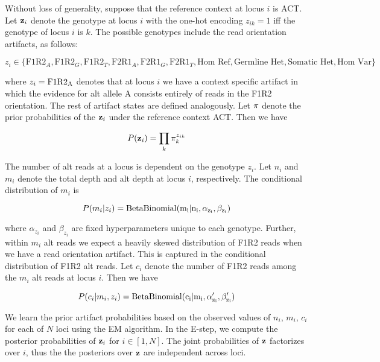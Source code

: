 \documentclass[nofootinbib,amssymb,amsmath]{revtex4}
\newcommand{\vz}{{\bf z}}
\newcommand{\vpi}{{\bf \pi}}
\begin{document}
Without loss of generality, suppose that the reference context at locus $i$ is ACT. Let $\vz_i$ denote the genotype at locus $i$ with the one-hot encoding $z_{ik} = 1$ iff the genotype of locus $i$ is $k$. The possible genotypes include the read orientation artifacts, as follows:

\begin{equation*}
z_i \in \{ \text{F1R2}_A, \text{F1R2}_G, \text{F1R2}_T, \text{F2R1}_A, \text{F2R1}_G, \text{F2R1}_T,  \text{Hom Ref}, \text{Germline Het}, \text{Somatic Het}, \text{Hom Var} \}
\end{equation*}

where $z_i = \rm{F1R2_A}$ denotes that at locus $i$ we have a context specific artifact in which the evidence for alt allele A consists entirely of reads in the F1R2 orientation. The rest of artifact states are defined analogously. Let $\vpi$ denote the prior probabilities of the $\vz_i$ under the reference context ACT. Then we have 

\begin{equation}
P(\vz_i) = \prod_k \pi_{k}^{z_{ik}}
\end{equation}

The number of alt reads at a locus is dependent on the genotype $z_i$. Let $n_i$ and $m_i$ denote the total depth and alt depth at locus $i$, respectively. The conditional distribution of $m_i$ is

\begin{equation}
P(m_i | z_i) = \rm{BetaBinomial}(m_i | n_i, \alpha_{z_i}, \beta_{z_i})
\end{equation}

where $\alpha_{z_i}$ and $\beta_{z_i}$ are fixed hyperparameters unique to each genotype. Further, within $m_i$ alt reads we expect a heavily skewed distribution of F1R2 reads when we have a read orientation artifact. This is captured in the conditional distribution of F1R2 alt reads. Let $c_i$ denote the number of F1R2 reads among the $m_i$ alt reads at locus $i$. Then we have

\begin{equation}
P(c_i | m_i, z_i) = \rm{BetaBinomial}( c_i | m_i, \alpha'_{z_i}, \beta'_{z_i})
\end{equation}

We learn the prior artifact probabilities based on the observed values of $n_i$, $m_i$, $c_i$ for each of $N$ loci using the EM algorithm. In the E-step, we compute the posterior probabilities of $\vz_i$ for $i \in [1, N]$. The joint probabilities of $\vz$ factorizes over $i$, thus the the posteriors over $\vz$ are independent across loci. 
\end{document}
